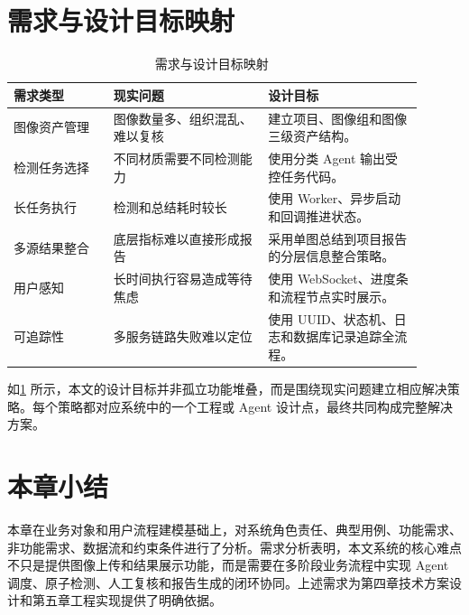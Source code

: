 \section{需求与设计目标映射}
\label{sec:requirement-goal-map}

\begin{table}[!htb]
  \caption{需求与设计目标映射}\label{tab:requirement-goal-map}
  \centering
  \begin{tabular}{@{}p{0.22\linewidth}p{0.34\linewidth}p{0.34\linewidth}@{}} \toprule
    \textbf{需求类型} & \textbf{现实问题} & \textbf{设计目标} \\ \midrule
    图像资产管理 & 图像数量多、组织混乱、难以复核 & 建立项目、图像组和图像三级资产结构。 \\
    检测任务选择 & 不同材质需要不同检测能力 & 使用分类 Agent 输出受控任务代码。 \\
    长任务执行 & 检测和总结耗时较长 & 使用 Worker、异步启动和回调推进状态。 \\
    多源结果整合 & 底层指标难以直接形成报告 & 采用单图总结到项目报告的分层信息整合策略。 \\
    用户感知 & 长时间执行容易造成等待焦虑 & 使用 WebSocket、进度条和流程节点实时展示。 \\
    可追踪性 & 多服务链路失败难以定位 & 使用 UUID、状态机、日志和数据库记录追踪全流程。 \\ \bottomrule
  \end{tabular}
\end{table}

如\cref{tab:requirement-goal-map} 所示，本文的设计目标并非孤立功能堆叠，而是围绕现实问题建立相应解决策略。每个策略都对应系统中的一个工程或 Agent 设计点，最终共同构成完整解决方案。

\section{本章小结}
\label{sec:req-summary}

本章在业务对象和用户流程建模基础上，对系统角色责任、典型用例、功能需求、非功能需求、数据流和约束条件进行了分析。需求分析表明，本文系统的核心难点不只是提供图像上传和结果展示功能，而是需要在多阶段业务流程中实现 Agent 调度、原子检测、人工复核和报告生成的闭环协同。上述需求为第四章技术方案设计和第五章工程实现提供了明确依据。
